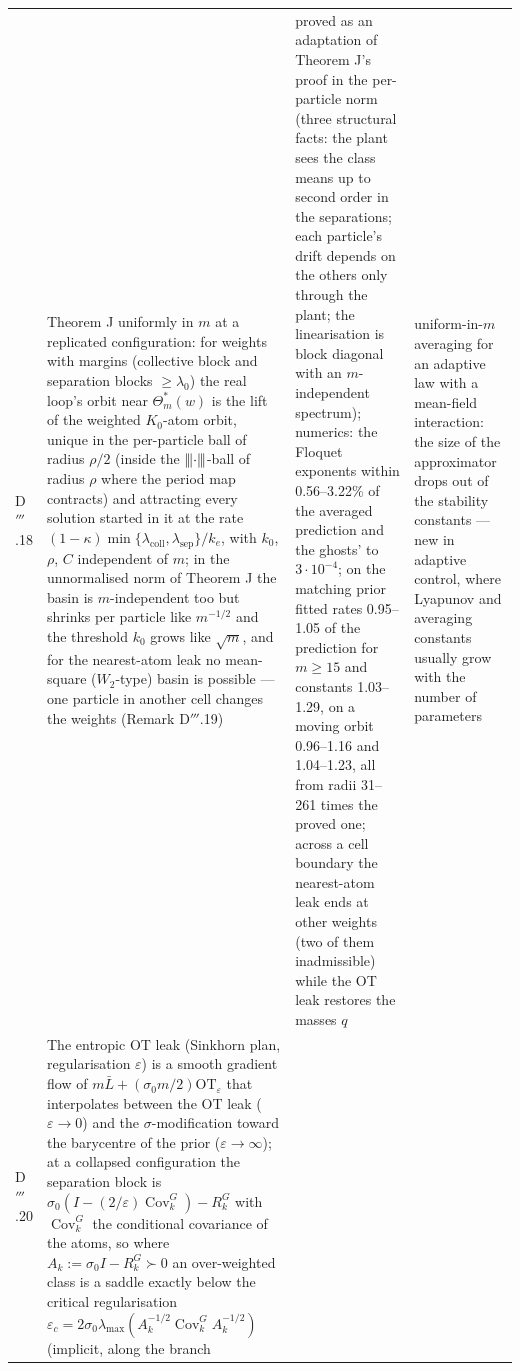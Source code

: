 {\begin{longtable}{@{}>{\raggedright\arraybackslash}p{}>{\raggedright\arraybackslash}p{}%
>{\raggedright\arraybackslash}p{}>{\raggedright\arraybackslash}p{}@{}}
\addlinespace[0.5pt]
D$'''$.18 & Theorem J uniformly in $m$ at a replicated configuration: for weights with margins (collective block and
separation blocks $\ge\lambda_0$) the real loop's orbit near $\Theta^*_m(w)$ is the lift of the weighted $K_0$-atom
orbit, unique in the per-particle ball of radius $\rho/2$ (inside the $\lvert\kern-0.25ex\lvert\kern-0.25ex\lvert \cdot\rvert\kern-0.25ex\rvert\kern-0.25ex\rvert$-ball of radius $\rho$ where the
period map contracts) and attracting every solution started in it at the rate
$(1 - \kappa)\min\{\lambda_{\mathrm{coll}},\lambda_{\mathrm{sep}}\}/k_e$, with $k_0$, $\rho$, $C$ independent of $m$;
in the unnormalised norm of Theorem J the basin is $m$-independent too but shrinks per particle like $m^{-1/2}$ and
the threshold $k_0$ grows like $\sqrt m$, and for the nearest-atom leak no mean-square ($W_2$-type) basin is possible
--- one particle in another cell changes the weights (Remark D$'''$.19)
& proved as an adaptation of Theorem J's proof in the per-particle norm (three structural facts: the plant sees the
class means up to second order in the separations; each particle's drift depends on the others only through the
plant; the linearisation is block diagonal with an $m$-independent spectrum); numerics: the Floquet exponents within
0.56--3.22\% of the averaged prediction and the ghosts' to $3\cdot10^{-4}$; on the matching prior fitted rates
0.95--1.05 of the prediction for $m\ge15$ and constants 1.03--1.29, on a moving orbit 0.96--1.16 and 1.04--1.23, all
from radii 31--261 times the proved one; across a cell boundary the nearest-atom leak ends at other weights (two of
them inadmissible) while the OT leak restores the masses $q$
& uniform-in-$m$ averaging for an adaptive law with a mean-field interaction: the size of the approximator drops out
of the stability constants --- new in adaptive control, where Lyapunov and averaging constants usually grow with the
number of parameters\\
\addlinespace[0.5pt]
D$'''$.20 & The entropic OT leak (Sinkhorn plan, regularisation $\varepsilon$) is a smooth gradient flow of
$m\bar L + (\sigma_0m/2)\mathrm{OT}_\varepsilon$ that interpolates between the OT leak ($\varepsilon\to0$) and the
$\sigma$-modification toward the barycentre of the prior ($\varepsilon\to\infty$); at a collapsed configuration the
separation block is $\sigma_0(I - (2/\varepsilon)\operatorname{Cov}^G_k) - R^G_k$ with $\operatorname{Cov}^G_k$ the
conditional covariance of the atoms, so where $A_k := \sigma_0I - R^G_k\succ0$ an over-weighted class is a saddle
exactly below the critical regularisation
$\varepsilon_c = 2\sigma_0\lambda_{\max}(A_k^{-1/2}\operatorname{Cov}^G_kA_k^{-1/2})$ (implicit, along the branch

\end{longtable}}
